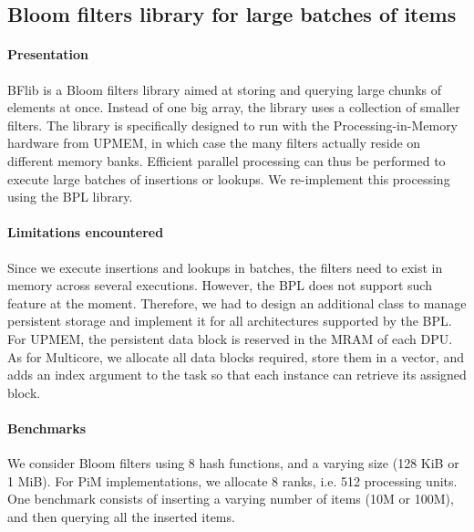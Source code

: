 \subsection{Bloom filters library for large batches of items}
\label{sec:bfs}

\paragraph{Presentation}
BFlib is a Bloom filters library aimed at storing and querying large chunks of elements at once.
Instead of one big array, the library uses a collection of smaller filters.
The library is specifically designed to run with the Processing-in-Memory hardware from UPMEM, in which case the many filters actually reside on different memory banks.
Efficient parallel processing can thus be performed to execute large batches of insertions or lookups.
We re-implement this processing using the BPL library.

\paragraph{Limitations encountered} Since we execute insertions and lookups in batches, the filters need to exist in memory across several executions.
However, the BPL does not support such feature at the moment.
Therefore, we had to design an additional class to manage persistent storage and implement it for all architectures supported by the BPL.
For UPMEM, the persistent data block is reserved in the MRAM of each DPU.
As for Multicore, we allocate all data blocks required, store them in a vector, and adds an index argument to the task so that each instance can retrieve its assigned block.

\paragraph{Benchmarks} We consider Bloom filters using 8 hash functions, and a varying size (128 KiB or 1 MiB).
For PiM implementations, we allocate 8 ranks, i.e. 512 processing units.
One benchmark consists of inserting a varying number of items (10M or 100M), and then querying all the inserted items.

